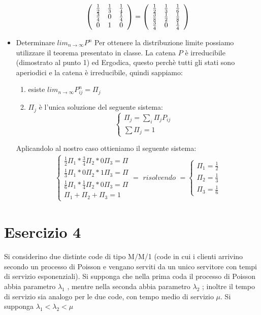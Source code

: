 \documentclass[a4paper]{article}
\begin{document}
\begin{itemize}
$$		\left(\begin{array}{c c c}{{\frac{1}{2}}}&{{\frac{1}{3}}}&{{\frac{1}{4}}}\\ {{\frac{3}{4}}}&{{0}}&{{\frac{1}{4}}}\\ {{0}}&{{1}}&{{0}}\end{array}\right)
		= \left(\begin{array}{c c c}{{\frac{1}{2}}}&{{\frac{1}{3}}}&{{\frac{1}{6}}}\\ {{\frac{3}{8}}}&{{\frac{1}{2}}}&{{\frac{1}{8}}}\\ {{\frac{3}{4}}}&{{0}}&{{\frac{1}{4}}}\end{array}\right) $$
	\item Determinare $lim_{n \rightarrow \infty}P^n$
		Per ottenere la distribuzione limite possiamo utilizzare il teorema presentato in classe. La catena $P$ è irreducibile (dimostrato al punto 1) ed Ergodica, questo perchè tutti gli stati sono aperiodici e la catena è irreducibile, quindi sappiamo:
		\begin{enumerate}
			\item esiste $lim_{n \rightarrow \infty}P^n_{ij}=\Pi_j$
			\item $\Pi_j$ è l'unica soluzione del seguente sistema: 
				\begin{equation*}
					\begin{cases} \Pi_j = \sum_i \Pi_j P_{ij}\\
						\sum \Pi_j = 1
					\end{cases}
				\end{equation*}
		\end{enumerate}
		Aplicandolo al nostro caso ottieniamo il seguente sistema:
		\begin{align*}
			\begin{cases}
				\frac{1}{2}\Pi_1 * \frac{3}{4}\Pi_2 * 0\Pi_3 = \Pi\\
				\frac{1}{3}\Pi_1 * 0\Pi_2 * 1\Pi_3 = \Pi\\
				\frac{1}{6}\Pi_1 * \frac{1}{4}\Pi_2 * 0\Pi_3 = \Pi\\
				\Pi_1 + \Pi_2 + \Pi_3 = 1
			\end{cases}
			= \textit{ risolvendo } = 
			\begin{cases}
				\Pi_1 = \frac{1}{2}\\
				\Pi_2 = \frac{1}{3}\\
				\Pi_3 = \frac{1}{6}
			\end{cases}
		\end{align*}
\end{itemize}
\section{Esercizio 4}
Si considerino due distinte code di tipo M/M/1 (code in cui i clienti arrivino secondo un processo di Poisson e vengano serviti da un unico servitore con tempi di servizio esponenziali).
Si supponga che nella prima coda il processo di Poisson abbia parametro $\lambda_1$ , mentre nella seconda abbia parametro $\lambda_2$ ; inoltre il tempo di servizio sia analogo per le due code, con tempo medio di servizio $\mu$. Si supponga $\lambda_1 < \lambda_2 < \mu$
\end{document}
